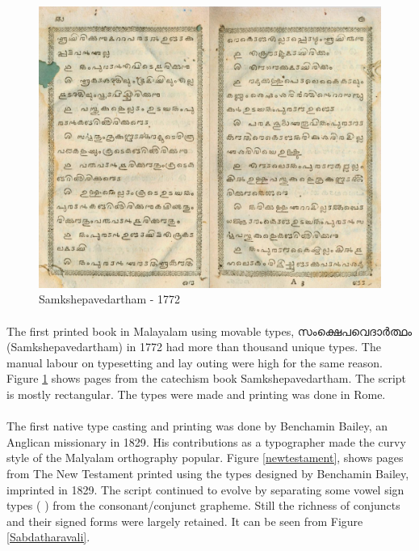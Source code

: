 \documentclass[10pt]{article}
\begin{document}
\begin{figure}[h!]
	\centering
	\includegraphics[width=\textwidth]{images/samkshepavedartham1772.png}
	\caption{Samkshepavedartham - 1772}
	\label{Samkshepam}
\end{figure} 


\paragraph{}
The first printed book in Malayalam using movable types, {\manjari സംക്ഷെപവെദാർത്ഥം} (Samkshepavedartham) in 1772 had more than thousand unique types\cite{babucherian}. The manual labour on typesetting and lay outing were high for the same reason. Figure \ref{Samkshepam} shows pages from the catechism book Samkshepavedartham. The script is mostly rectangular. The types were made and printing was done in Rome. 

\paragraph{}
The first native type casting and printing was done by Benchamin Bailey, an Anglican missionary in 1829\cite{babucherian}.  His contributions as a typographer made the curvy style of the Malyalam orthography popular\cite{gupthannair}. Figure \ref{newtestament}, shows pages from The New Testament printed using the types designed by Benchamin Bailey, imprinted in 1829\cite{babucherian}. The script continued to evolve by separating some vowel sign types ({ }) from the consonant/conjunct grapheme. Still the richness of conjuncts and their signed forms were largely retained. It can be seen from Figure \ref{Sabdatharavali}. 
\end{document}
